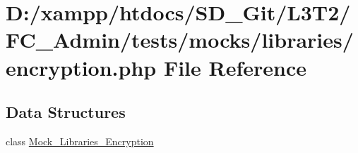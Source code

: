 \hypertarget{_admin_2tests_2mocks_2libraries_2_encryption_8php}{}\section{D\+:/xampp/htdocs/\+S\+D\+\_\+\+Git/\+L3\+T2/\+F\+C\+\_\+\+Admin/tests/mocks/libraries/encryption.php File Reference}
\label{_admin_2tests_2mocks_2libraries_2_encryption_8php}
\subsection*{Data Structures}
\begin{DoxyCompactItemize}
\item 
class \hyperlink{class_mock___libraries___encryption}{Mock\+\_\+\+Libraries\+\_\+\+Encryption}
\end{DoxyCompactItemize}
